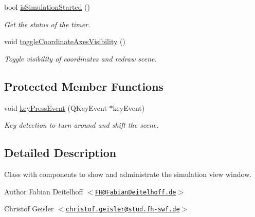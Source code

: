 \begin{DoxyCompactItemize}
bool \hyperlink{classSimulationView_a20413dcac5bc5d52b9d5fae836cf3f93}{is\-Simulation\-Started} ()
\begin{DoxyCompactList}\small\item\em \-Get the status of the timer. \end{DoxyCompactList}\item 
void \hyperlink{classSimulationView_a712a4c812faec9a14699c1ceb1048337}{toggle\-Coordinate\-Axes\-Visibility} ()
\begin{DoxyCompactList}\small\item\em \-Toggle visibility of coordinates and redraw scene. \end{DoxyCompactList}\end{DoxyCompactItemize}
\subsection*{\-Protected \-Member \-Functions}
\begin{DoxyCompactItemize}
\item 
void \hyperlink{classSimulationView_aabf60efd5011c63555e9bd154107f42d}{key\-Press\-Event} (\-Q\-Key\-Event $\ast$key\-Event)
\begin{DoxyCompactList}\small\item\em \-Key detection to turn around and shift the scene. \end{DoxyCompactList}\end{DoxyCompactItemize}


\subsection{\-Detailed \-Description}
\-Class with components to show and administrate the simulation view window.

\begin{DoxyAuthor}{\-Author}
\-Fabian \-Deitelhoff $<$\href{mailto:FH@FabianDeitelhoff.de}{\tt \-F\-H@\-Fabian\-Deitelhoff.\-de}$>$ 

\-Christof \-Geisler $<$\href{mailto:christof.geisler@stud.fh-swf.de}{\tt christof.\-geisler@stud.\-fh-\/swf.\-de}$>$ 
\end{DoxyAuthor}


